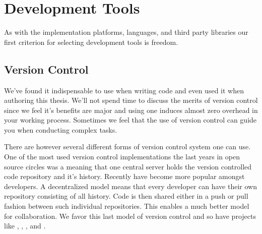 

\section{Development Tools}

As with the implementation platforms, languages, and third party libraries
our first criterion for selecting development tools is freedom.

\subsection{Version Control}

We've found it indispensable to use  when writing code
and even used it when authoring this thesis. We'll not spend time to discuss
the merits of version control since we feel it's benefits are major and
using one induces almost zero overhead in your working process. Sometimes we
feel that the use of version control can guide you when conducting complex
tasks.

There are however several different forms of version control system one can
use. One of the most used version control implementations the last years
in open source circles was
%
\dash{}a  meaning that one central
server holds the version controlled code repository and it's history.%
Recently  have become more popular
amongst developers. A decentralized model means that every developer can have
their own repository consisting of all history.%
Code is then shared either in a push or pull fashion between such individual
repositories. This enables a much better model for collaboration.
We favor this last model of version control and so have projects
like , , ,
and .%


